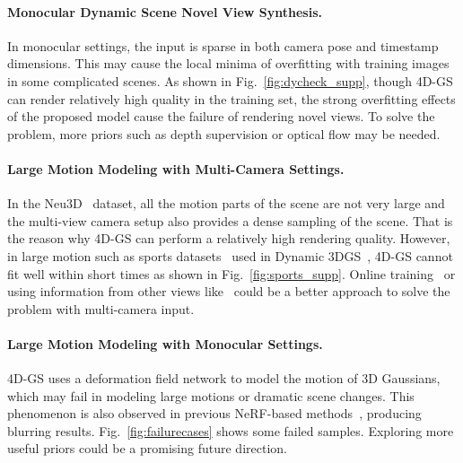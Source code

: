 \documentclass[10pt,twocolumn,letterpaper]{article}
\begin{document}
\paragraph{Monocular Dynamic Scene Novel View Synthesis.}
In monocular settings, the input is sparse in both camera pose and timestamp dimensions. This may cause the local minima of overfitting with training images in some complicated scenes. As shown in Fig.~\ref{fig:dycheck_supp}, though 4D-GS can render relatively high quality in the training set, the strong overfitting effects of the proposed model cause the failure of rendering novel views. To solve the problem, more priors such as depth supervision or optical flow may be needed.

\paragraph{Large Motion Modeling with Multi-Camera Settings.}
In the Neu3D~\cite{li2022neural} dataset, all the motion parts of the scene are not very large and the multi-view camera setup also provides a dense sampling of the scene. That is the reason why 4D-GS can perform a relatively high rendering quality. However, in large motion such as sports datasets~\cite{joo2015panopticstudio} used in Dynamic 3DGS~\cite{dynamic3dgs}, 4D-GS cannot fit well within short times as shown in Fig.~\ref{fig:sports_supp}. Online training~\cite{dynamic3dgs,abou2022particlenerf} or using information from other views like~\cite{lin2023im4d,wang2021ibrnet} could be a better approach to solve the problem with multi-camera input.

\paragraph{Large Motion Modeling with Monocular Settings.}
4D-GS uses a deformation field network to model the motion of 3D Gaussians, which may fail in modeling large motions or dramatic scene changes. This phenomenon is also observed in previous NeRF-based methods~\cite{tineuvox,pumarola2021dnerf,park2021hypernerf,li2022neural}, producing blurring results. Fig.~\ref{fig:failurecases} shows some failed samples. Exploring more useful priors could be a promising future direction.


%     
%     
% 

\end{document}
